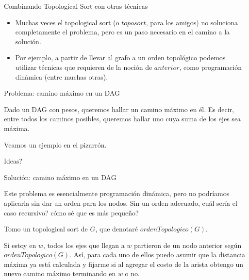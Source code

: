 \documentclass[compress]{beamer}
\begin{document}
\begin{frame}{Combinando Topological Sort con otras técnicas}

\begin{itemize}
\item Muchas veces el topological sort (o $toposort$, para los amigos) no
soluciona completamente el problema, pero es un paso necesario en el
camino a la solución.

\item Por ejemplo, a partir de llevar al grafo a un orden topológico 
podemos utilizar técnicas que requieren de la noción de $anterior$,
como programación dinámica (entre muchas otras).
\end{itemize}

\end{frame}


\begin{frame}{Problema: camino máximo en un DAG}

Dado un DAG con pesos, queremos hallar un camino máximo en él. Es decir,
entre todos los caminos posibles, queremos hallar uno cuya suma de los
ejes sea máxima.

\bigskip

Veamos un ejemplo en el pizarrón.

\bigskip

\begin{center}
\textquestiondown Ideas?
\end{center}

\end{frame}

\begin{frame}{Solución: camino máximo en un DAG}

Este problema es esencialmente programación dinámica, pero no podríamos
aplicarla sin dar un orden para los nodos. Sin un orden adecuado,
\textquestiondown cuál sería el caso recursivo? \textquestiondown
cómo sé que es más pequeño?

\bigskip

Tomo un topological sort de $G$, que denotaré $ordenTopologico(G)$.

Si estoy en $w$, todos los ejes que llegan a $w$ partieron de un nodo
anterior según $ordenTopologico(G)$. Así, para cada uno de ellos puedo
asumir que la distancia máxima ya está calculada y fijarme si al agregar
el costo de la arista obtengo un nuevo camino máximo terminando en $w$
o no. \\

\end{frame}
\end{document}
